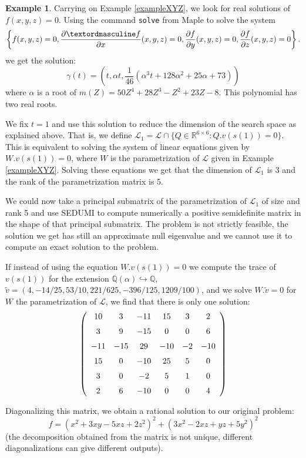 \documentclass{amsart}
\theoremstyle{definition}
\newtheorem{example}[theorem]{Example}
\theoremstyle{remark}
\numberwithin{equation}{section}
\newcommand{\eLL}{{\mathcal L}}
\newcommand{\Q}{{\mathbb Q}}
\newcommand{\R}{{\mathbb R}}
\begin{document}
\begin{example}
Carrying on Example \ref{exampleXYZ}, we look for real solutions of $f(x,y,z) = 0$.
Using the command \texttt{solve} from Maple to solve the system
\[
\left\{f(x,y,z) = 0, \frac{\partialº f}{\partial x}(x,y,z) = 0, \frac{\partial f}{\partial y}(x,y,z) = 0, \frac{\partial f}{\partial z}(x,y,z) = 0\right\}.
\]
we get the solution:
\[
\gamma(t) = \left(t, \alpha t,  \frac{1}{46} (\alpha^3t+128\alpha^2+25\alpha+73) \right)
\]
where $\alpha$ is a root of $m(Z) = 50Z^4+28Z^3-Z^2+23Z-8$. This polynomial has two real roots.

We fix $t=1$ and use this solution to reduce the dimension of the search space as explained above.  That is, we define $\eLL_1 = \eLL \cap \{Q\in \R^{6\times 6} :Q . v(s(1)) = 0\}$. This is equivalent to solving the system of linear equations given by $W.v(s(1)) = 0$, where $W$ is the parametrization of $\eLL$ given in Example \ref{exampleXYZ}. Solving these equations we get that the dimension of $\eLL_1$ is 3 and the rank of the parametrization matrix is 5.

 We could now take a principal submatrix of the parametrization of $\eLL_1$ of size and rank 5 and use SEDUMI to compute numerically a positive semidefinite matrix in the shape of that principal submatrix. The problem is not strictly feasible, the solution we get has still an approximate null eigenvalue and we cannot use it to compute an exact solution to the problem.

If instead of using the equation $W . v(s(1))=0$ we compute the trace of $v(s(1))$ for the extension $\Q(\alpha) \hookrightarrow \Q$, $\tilde v = (4, -14/25, 53/10, 221/625, -396/125, 1209/100)$, and we solve $W .\tilde v = 0$ for $W$ the parametrization of $\eLL$, we find that there is only one solution:
\[
  \left( \begin {array}{cccccc} 10&3&-11&15&3&2\\ \noalign{\medskip}3&9&-15&0&0&6\\ \noalign{\medskip}-11&-15&29&-10&-2&-10\\ \noalign{\medskip}15&0&-10&25&5&0\\ \noalign{\medskip}3&0&-2&5&1&0\\ \noalign{\medskip}2&6&-10&0&0&4\end {array} \right)
\]

Diagonalizing this matrix, we obtain a rational solution to our original problem:
\[
f = (x^2 + 3xy - 5xz+ 2z^2)^2 + (3x^2 - 2xz +yz+5y^2)^2
\]
(the decomposition obtained from the matrix is not unique, different diagonalizations can give different outputs).

\end{example}
\end{document}
